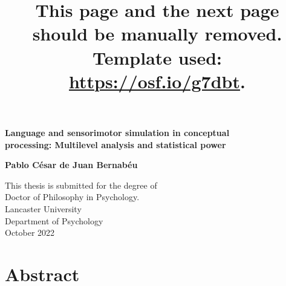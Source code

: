 \documentclass[
  12pt,
  man,floatsintext]{apa7}
\title{This page and the next page should be manually removed. Template used: \url{https://osf.io/g7dbt}.}
\author{\phantom{0}}
\date{}
\affiliation{\phantom{0}}
\begin{document}
\maketitle

\clearpage

\mbox{}\thispagestyle{empty}\clearpage

\setcounter{page}{1}

\thispagestyle{empty}
\begin{center}
\vspace*{20mm}
\textbf{\Large
Language and sensorimotor simulation in conceptual  \\ 
\bigskip
processing: Multilevel analysis and statistical power
}\\

\vspace*{26mm}

\textbf{\Large Pablo César de Juan Bernabéu }\\

\vspace*{30mm}

{\large {}
This thesis is submitted for the degree of  \\
Doctor of Philosophy in Psychology.  \\
\bigskip
\bigskip
Lancaster University  \\
Department of Psychology  \\
\bigskip
\bigskip
October 2022
}
\end{center}

\newpage

\hypertarget{abstract}{%
\section{Abstract}\label{abstract}}
\end{document}
